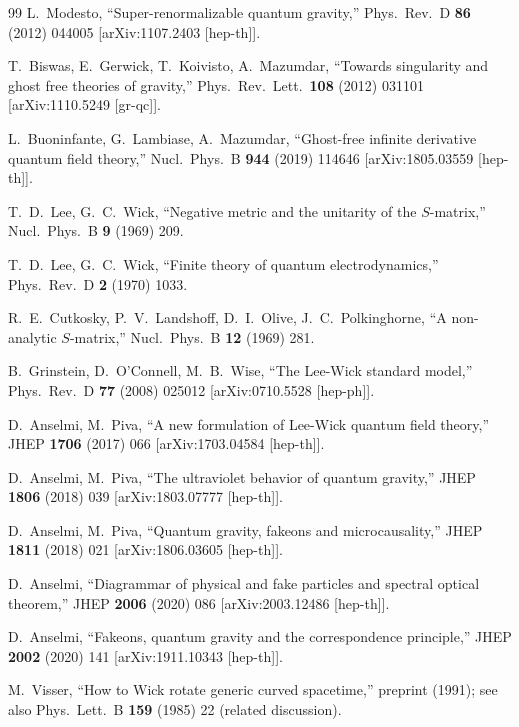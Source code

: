 \documentclass[12pt,a4paper]{article}
\theoremstyle{definition}
\theoremstyle{remark}
\begin{document}
\begin{thebibliography}{99}
  L.~Modesto,
  ``Super-renormalizable quantum gravity,''
  Phys.\ Rev.\ D \textbf{86} (2012) 044005
  [arXiv:1107.2403 [hep-th]].

  T.~Biswas, E.~Gerwick, T.~Koivisto, A.~Mazumdar,
  ``Towards singularity and ghost free theories of gravity,''
  Phys.\ Rev.\ Lett.\ \textbf{108} (2012) 031101
  [arXiv:1110.5249 [gr-qc]].

  L.~Buoninfante, G.~Lambiase, A.~Mazumdar,
  ``Ghost-free infinite derivative quantum field theory,''
  Nucl.\ Phys.\ B \textbf{944} (2019) 114646
  [arXiv:1805.03559 [hep-th]].

  T.~D.~Lee, G.~C.~Wick,
  ``Negative metric and the unitarity of the $S$-matrix,''
  Nucl.\ Phys.\ B \textbf{9} (1969) 209.

  T.~D.~Lee, G.~C.~Wick,
  ``Finite theory of quantum electrodynamics,''
  Phys.\ Rev.\ D \textbf{2} (1970) 1033.

  R.~E.~Cutkosky, P.~V.~Landshoff, D.~I.~Olive,
  J.~C.~Polkinghorne,
  ``A non-analytic $S$-matrix,''
  Nucl.\ Phys.\ B \textbf{12} (1969) 281.

  B.~Grinstein, D.~O'Connell, M.~B.~Wise,
  ``The Lee-Wick standard model,''
  Phys.\ Rev.\ D \textbf{77} (2008) 025012
  [arXiv:0710.5528 [hep-ph]].

  D.~Anselmi, M.~Piva,
  ``A new formulation of Lee-Wick quantum field theory,''
  JHEP \textbf{1706} (2017) 066
  [arXiv:1703.04584 [hep-th]].

  D.~Anselmi, M.~Piva,
  ``The ultraviolet behavior of quantum gravity,''
  JHEP \textbf{1806} (2018) 039
  [arXiv:1803.07777 [hep-th]].

  D.~Anselmi, M.~Piva,
  ``Quantum gravity, fakeons and microcausality,''
  JHEP \textbf{1811} (2018) 021
  [arXiv:1806.03605 [hep-th]].

  D.~Anselmi,
  ``Diagrammar of physical and fake particles and spectral optical
  theorem,''
  JHEP \textbf{2006} (2020) 086
  [arXiv:2003.12486 [hep-th]].

  D.~Anselmi,
  ``Fakeons, quantum gravity and the correspondence principle,''
  JHEP \textbf{2002} (2020) 141
  [arXiv:1911.10343 [hep-th]].

  M.~Visser,
  ``How to Wick rotate generic curved spacetime,''
  preprint (1991); see also
  Phys.\ Lett.\ B \textbf{159} (1985) 22 (related discussion).


\end{thebibliography}
\end{document}
